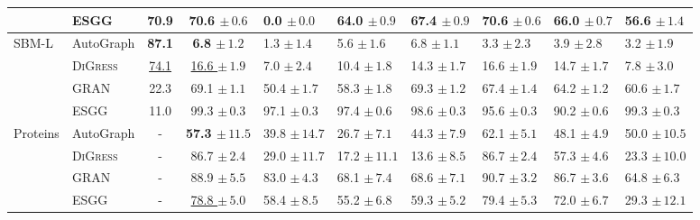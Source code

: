 \begin{tabular}{llccp{1.6cm}p{1.6cm}p{1.6cm}p{1.6cm}p{1.6cm}p{1.6cm}}
 & ESGG & 70.9 & 70.6 $\pm\,\scriptstyle{0.6}$ & 0.0 $\pm\,\scriptstyle{0.0}$ & 64.0 $\pm\,\scriptstyle{0.9}$ & 67.4 $\pm\,\scriptstyle{0.9}$ & 70.6 $\pm\,\scriptstyle{0.6}$ & 66.0 $\pm\,\scriptstyle{0.7}$ & 56.6 $\pm\,\scriptstyle{1.4}$ \\
\midrule
\textsc{SBM-L} & AutoGraph & \textbf{87.1} & \textbf{6.8 $\pm\,\scriptstyle{1.2}$} & 1.3 $\pm\,\scriptstyle{1.4}$ & 5.6 $\pm\,\scriptstyle{1.6}$ & 6.8 $\pm\,\scriptstyle{1.1}$ & 3.3 $\pm\,\scriptstyle{2.3}$ & 3.9 $\pm\,\scriptstyle{2.8}$ & 3.2 $\pm\,\scriptstyle{1.9}$ \\
 & \textsc{DiGress} & \underline{74.1} & \underline{16.6 $\pm\,\scriptstyle{1.9}$} & 7.0 $\pm\,\scriptstyle{2.4}$ & 10.4 $\pm\,\scriptstyle{1.8}$ & 14.3 $\pm\,\scriptstyle{1.7}$ & 16.6 $\pm\,\scriptstyle{1.9}$ & 14.7 $\pm\,\scriptstyle{1.7}$ & 7.8 $\pm\,\scriptstyle{3.0}$ \\
 & GRAN & 22.3 & 69.1 $\pm\,\scriptstyle{1.1}$ & 50.4 $\pm\,\scriptstyle{1.7}$ & 58.3 $\pm\,\scriptstyle{1.8}$ & 69.3 $\pm\,\scriptstyle{1.2}$ & 67.4 $\pm\,\scriptstyle{1.4}$ & 64.2 $\pm\,\scriptstyle{1.2}$ & 60.6 $\pm\,\scriptstyle{1.7}$ \\
 & ESGG & 11.0 & 99.3 $\pm\,\scriptstyle{0.3}$ & 97.1 $\pm\,\scriptstyle{0.3}$ & 97.4 $\pm\,\scriptstyle{0.6}$ & 98.6 $\pm\,\scriptstyle{0.3}$ & 95.6 $\pm\,\scriptstyle{0.3}$ & 90.2 $\pm\,\scriptstyle{0.6}$ & 99.3 $\pm\,\scriptstyle{0.3}$ \\
\midrule
Proteins & AutoGraph & - & \textbf{57.3 $\pm\,\scriptstyle{11.5}$} & 39.8 $\pm\,\scriptstyle{14.7}$ & 26.7 $\pm\,\scriptstyle{7.1}$ & 44.3 $\pm\,\scriptstyle{7.9}$ & 62.1 $\pm\,\scriptstyle{5.1}$ & 48.1 $\pm\,\scriptstyle{4.9}$ & 50.0 $\pm\,\scriptstyle{10.5}$ \\
 & \textsc{DiGress} & - & 86.7 $\pm\,\scriptstyle{2.4}$ & 29.0 $\pm\,\scriptstyle{11.7}$ & 17.2 $\pm\,\scriptstyle{11.1}$ & 13.6 $\pm\,\scriptstyle{8.5}$ & 86.7 $\pm\,\scriptstyle{2.4}$ & 57.3 $\pm\,\scriptstyle{4.6}$ & 23.3 $\pm\,\scriptstyle{10.0}$ \\
 & GRAN & - & 88.9 $\pm\,\scriptstyle{5.5}$ & 83.0 $\pm\,\scriptstyle{4.3}$ & 68.1 $\pm\,\scriptstyle{7.4}$ & 68.6 $\pm\,\scriptstyle{7.1}$ & 90.7 $\pm\,\scriptstyle{3.2}$ & 86.7 $\pm\,\scriptstyle{3.6}$ & 64.8 $\pm\,\scriptstyle{6.3}$ \\
 & ESGG & - & \underline{78.8 $\pm\,\scriptstyle{5.0}$} & 58.4 $\pm\,\scriptstyle{8.5}$ & 55.2 $\pm\,\scriptstyle{6.8}$ & 59.3 $\pm\,\scriptstyle{5.2}$ & 79.4 $\pm\,\scriptstyle{5.3}$ & 72.0 $\pm\,\scriptstyle{6.7}$ & 29.3 $\pm\,\scriptstyle{12.1}$ \\
\bottomrule
\end{tabular}